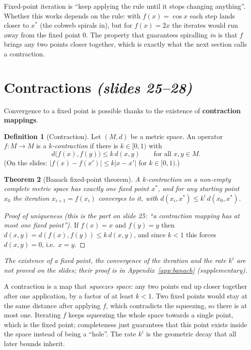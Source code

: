 \documentclass[11pt,a4paper]{article}
\newcommand{\abs}[1]{\left\lvert #1\right\rvert}
\newcommand{\slides}[1]{\texorpdfstring{\emph{(slides #1)}}{(slides #1)}}
\newcommand{\pdfnum}[1]{\setcounter{theorem}{\numexpr #1-1\relax}}
\theoremstyle{plain}
\newtheorem{theorem}{Theorem}
\theoremstyle{definition}
\newtheorem{definition}[theorem]{Definition}
\theoremstyle{remark}
\begin{document}
\begin{intuition}
Fixed-point iteration is ``keep applying the rule until it stops changing anything''. Whether this works depends on the rule: with $f(x)=\cos x$ each step lands closer to $x^*$ (the cobweb spirals in), but for $f(x)=2x$ the iterates would run away from the fixed point $0$. The property that guarantees spiralling \emph{in} is that $f$ brings any two points closer together, which is exactly what the next section calls a contraction.
\end{intuition}
\section{Contractions \slides{25--28}}\label{sec:contr}
Convergence to a fixed point is possible thanks to the existence of \textbf{contraction mappings}.

\pdfnum{1}
\begin{definition}[Contraction]\label{def:contraction}
Let $(M,d)$ be a metric space. An operator $f:M\to M$ is a \emph{$k$-contraction} if there is $k\in[0,1)$ with
\[
d\big(f(x),f(y)\big)\le k\,d(x,y)\qquad\text{for all }x,y\in M .
\]
(On the slides: $\abs{f(x)-f(x')}\le k\abs{x-x'}$ for $k\in[0,1)$.)
\end{definition}

\pdfnum{2}
\begin{theorem}[Banach fixed-point theorem]\label{thm:banach}
A $k$-contraction on a non-empty \emph{complete} metric space has \emph{exactly one} fixed point $x^*$, and for any starting point $x_0$ the iteration $x_{i+1}=f(x_i)$ converges to it, with $d(x_i,x^*)\le k^i\,d(x_0,x^*)$.
\end{theorem}
\begin{proof}[Proof of uniqueness (this is the part on slide 25: ``a contraction mapping has at most one fixed point'')]
If $f(x)=x$ and $f(y)=y$ then $d(x,y)=d(f(x),f(y))\le k\,d(x,y)$, and since $k<1$ this forces $d(x,y)=0$, i.e.\ $x=y$.
\end{proof}
\emph{The existence of a fixed point, the convergence of the iteration and the rate $k^i$ are not proved on the slides; their proof is in Appendix~\ref{app:banach} (supplementary).}

\begin{intuition}
A contraction is a map that \emph{squeezes space}: any two points end up closer together after one application, by a factor of at least $k<1$. Two fixed points would stay at the same distance after applying $f$, which contradicts the squeezing, so there is at most one. Iterating $f$ keeps squeezing the whole space towards a single point, which is the fixed point; completeness just guarantees that this point exists inside the space instead of being a ``hole''. The rate $k^i$ is the geometric decay that all later bounds inherit.
\end{intuition}
\end{document}
